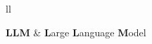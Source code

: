 

\begin{abbreviations}{ll}

\textbf{LLM} & \textbf{L}arge \textbf{L}anguage \textbf{M}odel\\

\end{abbreviations}



%
%
%



%
%
%
%
